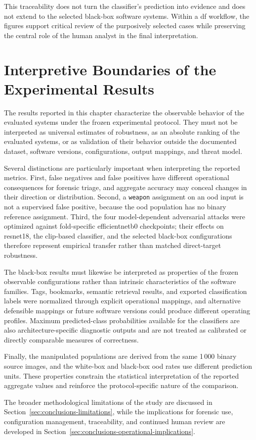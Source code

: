 This traceability does not turn the classifier's prediction into evidence and does
not extend to the selected black-box software systems. Within a \gls{df}
workflow, the figures support critical review of the purposively selected cases
while preserving the central role of the human analyst in the final
interpretation.


\section{Interpretive Boundaries of the Experimental Results}
\label{sec:results-limitations}

The results reported in this chapter characterize the observable behavior of
the evaluated systems under the frozen experimental protocol. They must not be
interpreted as universal estimates of robustness, as an absolute ranking of the
evaluated systems, or as validation of their behavior outside the documented
dataset, software versions, configurations, output mappings, and threat model.

Several distinctions are particularly important when interpreting the reported
metrics. First, false negatives and false positives have different operational
consequences for forensic triage, and aggregate accuracy may conceal changes in
their direction or distribution. Second, a \texttt{weapon} assignment on an
\gls{ood} input is not a supervised false positive, because the \gls{ood}
population has no binary reference assignment. Third, the four model-dependent
adversarial attacks were optimized against fold-specific
\gls{efficientnetb0} checkpoints; their effects on \gls{resnet18}, the
\gls{clip}-based classifier, and the selected black-box configurations therefore
represent empirical transfer rather than matched direct-target robustness.

The black-box results must likewise be interpreted as properties of the frozen
observable configurations rather than intrinsic characteristics of the software
families. Tags, bookmarks, semantic retrieval results, and exported
classification labels were normalized through explicit operational mappings,
and alternative defensible mappings or future software versions could produce
different operating profiles. Maximum predicted-class probabilities available
for the classifiers are also architecture-specific diagnostic outputs and are
not treated as calibrated or directly comparable measures of correctness.

Finally, the manipulated populations are derived from the same 1\,000 binary
source images, and the white-box and black-box \gls{ood} rates use different
prediction units. These properties constrain the statistical interpretation of
the reported aggregate values and reinforce the protocol-specific nature of the
comparison.

The broader methodological limitations of the study are discussed in
Section~\ref{sec:conclusions-limitations}, while the implications for forensic
use, configuration management, traceability, and continued human review are
developed in Section~\ref{sec:conclusions-operational-implications}.
